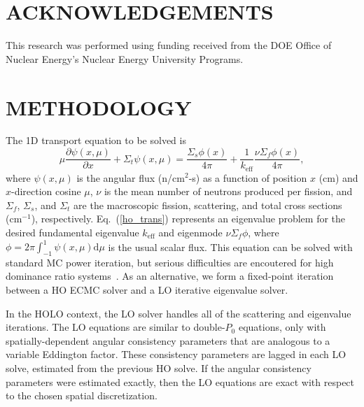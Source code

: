 \documentclass[10pt,twocolumn,pdftex,superscriptaddress]{anstrans}
\renewcommand{\eqref}[1]{(\ref{#1})}
\newcommand{\pderiv}[2]{\frac{\partial #1}{\partial #2}}
\renewcommand{\d}{\mathrm{d}}
\newcommand{\keff}{\ensuremath{k_{\text{eff}}}}
\newcommand{\sig}[1]{\ensuremath{\Sigma_{#1}}}
\begin{document}
\section*{ACKNOWLEDGEMENTS}

This research was performed using funding received from the DOE Office of Nuclear
Energy's Nuclear Energy University Programs.

\section*{METHODOLOGY}

The 1D transport equation to be solved is
\begin{equation}
    \mu \pderiv{\psi(x,\mu)}{x} + \Sigma_t \psi(x,\mu) = \frac{\Sigma_s \phi(x)}{4 \pi} +
    \frac{1}{\keff} \frac{\nu \sig f \phi(x)}{ 4 \pi},\label{ho_trans}
\end{equation}
where $\psi(x,\mu)$ is the angular flux (n/cm$^2$-s) as a function of position $x$
(cm) and $x$-direction cosine $\mu$, $\nu$ is the mean number of neutrons produced
per fission, and $\Sigma_f$, $\Sigma_s$, and $\Sigma_t$ are the macroscopic fission, 
scattering, and total cross sections (cm$^{-1}$), respectively.  
  Eq.~\eqref{ho_trans} represents an eigenvalue
problem for the desired fundamental eigenvalue $\keff$ and eigenmode $\nu \Sigma_f \phi$,
where $\phi=2\pi \int_{-1}^1 \psi(x,\mu) \d \mu$ is the usual scalar flux. This
equation can be solved with standard MC power iteration, but serious difficulties are
encoutered for high dominance ratio systems~\cite{willert}.  As an alternative, we form
a fixed-point iteration between a HO ECMC solver and a LO iterative eigenvalue
solver.  

In the HOLO context, the LO solver handles all of the scattering and eigenvalue
iterations.  The LO equations are similar to double-$P_0$ equations, only with
spatially-dependent angular consistency parameters that are analogous to a variable
Eddington factor.  These consistency parameters are lagged in each LO solve,
estimated from the previous HO solve.
If the angular consistency parameters were estimated exactly, then the LO equations are exact with respect to the chosen
spatial discretization.  
\end{document}
